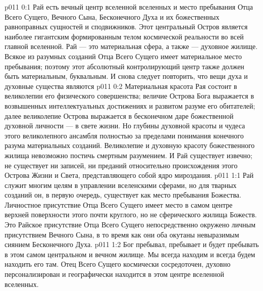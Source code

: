 \author{Совершенствователь Мудрости}
\vs p011 0:1 Рай есть вечный центр вселенной вселенных и место пребывания Отца Всего Сущего, Вечного Сына, Бесконечного Духа и их божественных равноправных сущностей и сподвижников. Этот центральный Остров является наиболее гигантским формированным телом космической реальности во всей главной вселенной. Рай --- это материальная сфера, а также --- духовное жилище. Всякое из разумных созданий Отца Всего Сущего имеет материальное место пребывания; поэтому этот абсолютный контролирующий центр также должен быть материальным, буквальным. И снова следует повторить, что вещи духа и духовные существа являются 
\vs p011 0:2 Материальная красота Рая состоит в великолепии его физического совершенства; величие Острова Бога выражается в возвышенных интеллектуальных достижениях и развитом разуме его обитателей; далее великолепие Острова выражается в бесконечном даре божественной духовной личности --- в свете жизни. Но глубины духовной красоты и чудеса этого великолепного ансамбля полностью за пределами понимания конечного разума материальных созданий. Великолепие и духовную красоту божественного жилища невозможно постичь смертным разумением. И Рай существует извечно; не существует ни записей, ни преданий относительно происхождения этого Острова Жизни и Света, представляющего собой ядро мироздания.
\vs p011 1:1 Рай служит многим целям в управлении вселенскими сферами, но для тварных созданий он, в первую очередь, существует как место пребывания Божества. Личностное присутствие Отца Всего Сущего имеет место в самом центре верхней поверхности этого почти круглого, но не сферического жилища Божеств. Это Райское присутствие Отца Всего Сущего непосредственно окружено личным присутствием Вечного Сына, в то время как они оба окутаны невыразимым сиянием Бесконечного Духа.
\vs p011 1:2 Бог пребывал, пребывает и будет пребывать в этом самом центральном и вечном жилище. Мы всегда находим и всегда будем находить его там. Отец Всего Сущего космически сосредоточен, духовно персонализирован и географически находится в этом центре вселенной вселенных.
